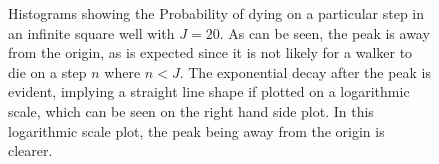 \documentclass[journal]{IEEEtran}
\begin{document}
\begin{figure}[ht!]
  \centering
  \centering
  \caption{Histograms showing the Probability of dying on a particular step in
    an infinite square well with $J = 20$. As can be seen, the peak is away from the
    origin, as is expected since it is not likely for a walker to die on a step $n$
    where $n < J$. The exponential decay after the peak is evident, implying a
    straight line shape if plotted on a logarithmic scale, which can be seen on
    the right hand side plot. In this logarithmic scale plot, the peak being away
    from the origin is clearer.}
  \label{fig:expplots}
\end{figure}
\end{document}
